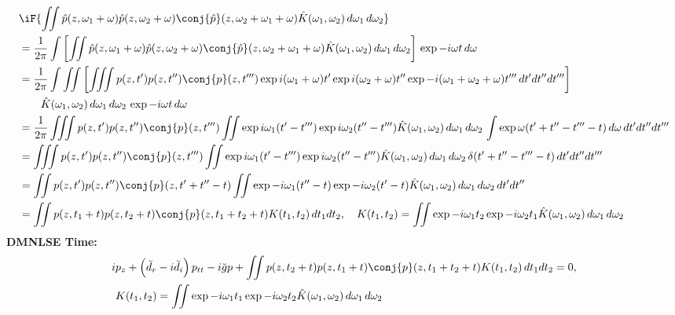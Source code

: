 \begin{equation}\label{equ:CGLE+DM_O2_4}
\begin{split}
&\iF{ \iint \hat{p}(z, \omega_1 + \omega)  \hat{p}(z,\omega_2+\omega) \conj{\hat{p}}(z,\omega_2+\omega_1 + \omega) \hat{K}(\omega_1,\omega_2)  \,d\omega_1 \,d\omega_2 }\\
& = \frac{1}{2\pi} \int \left[\iint \hat{p}(z, \omega_1 + \omega)  \hat{p}(z,\omega_2+\omega) \conj{\hat{p}}(z,\omega_2+\omega_1 + \omega) \hat{K}(\omega_1,\omega_2) \,d\omega_1 \,d\omega_2 \right] \, \exp{-i \omega t} \,d\omega\\
& = \frac{1}{2\pi} \int \iint  \left[\iiint p(z, t') p(z,t'') \conj{p}(z,t^{\prime \prime \prime}) \exp{i (\omega_1 + \omega) t'} \exp{i (\omega_2 + \omega) t''} \exp{-i (\omega_1 + \omega_2 + \omega) t^{\prime \prime \prime}} \,dt'dt'' dt^{\prime \prime \prime} \right] \\
&\quad \quad \hat{K}(\omega_1,\omega_2) \,d\omega_1 \,d\omega_2 \, \exp{-i \omega t} \,d\omega\\
& = \frac{1}{2\pi}  \iiint p(z, t') p(z,t'') \conj{p}(z,t^{\prime \prime \prime}) \iint \exp{i \omega_1 (t'-t^{\prime \prime \prime}) } \exp{i \omega_2 (t''- t^{\prime \prime \prime}) }   \hat{K}(\omega_1,\omega_2) \,d\omega_1 \,d\omega_2  \, \int \exp{ \omega (t' +t'' - t^{\prime \prime \prime} - t) } \,d\omega  \, dt'dt'' dt^{\prime \prime \prime} \\
& =  \iiint p(z, t') p(z,t'') \conj{p}(z,t^{\prime \prime \prime}) \iint \exp{i \omega_1 (t'-t^{\prime \prime \prime}) } \exp{i \omega_2 (t''- t^{\prime \prime \prime}) }   \hat{K}(\omega_1,\omega_2) \,d\omega_1 \,d\omega_2  \, \delta(t' +t'' - t^{\prime \prime \prime} - t)   \, dt'dt'' dt^{\prime \prime \prime} \\
& =  \iint p(z, t') p(z,t'') \conj{p}(z,t' +t'' - t) \iint \exp{-i \omega_1 (t'' - t) } \exp{-i \omega_2 (t'- t) }   \hat{K}(\omega_1,\omega_2) \,d\omega_1 \,d\omega_2   \, dt'dt''\\
& =  \iint p(z, t_1+t) p(z,t_2 + t) \conj{p}(z,t_1 + t_2 + t) K(t_1,t_2)  \, dt_1 dt_2,\quad K(t_1,t_2) = \iint \exp{-i \omega_1 t_2 } \exp{-i \omega_2 t_1 }   \hat{K}(\omega_1,\omega_2) \,d\omega_1 \,d\omega_2  
\end{split}
\end{equation}
\textbf{DMNLSE Time:}
\begin{equation}\label{equ:DMCGLE_Time}
\begin{split}
i&p_z + \left(\breve{d}_r - i \breve{d}_i\right)p_{tt} - i \breve{g} p + \iint p(z,t_2+t) p(z,t_1+t) \conj{p}(z,t_1+t_2+t) K(t_1,t_2)  \,dt_1 dt_2 = 0, \\
& K(t_1,t_2) = \iint \exp{-i \omega_1 t_1 } \exp{-i \omega_2 t_2 }   \hat{K}(\omega_1,\omega_2) \,d\omega_1 \,d\omega_2   \\
\end{split}
\end{equation}
